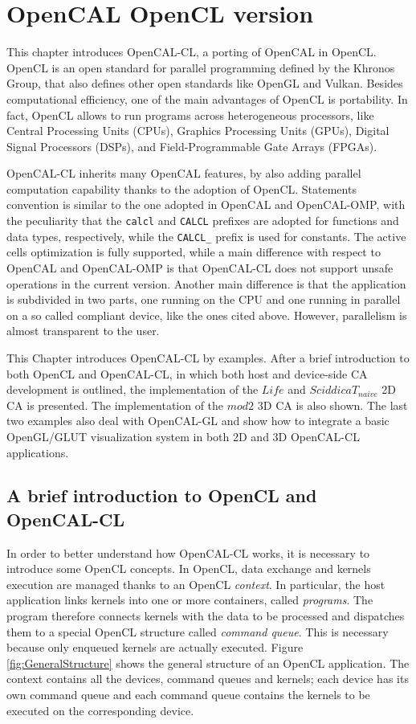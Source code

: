 \chapter{OpenCAL OpenCL version}\label{ch:opencal-cl}

This chapter introduces OpenCAL-CL, a porting of OpenCAL in
OpenCL. OpenCL is an open standard for parallel programming defined by the
Khronos Group, that also defines other open standards like OpenGL and
Vulkan. Besides computational efficiency, one of the main advantages
of OpenCL is portability. In fact, OpenCL allows to run programs across
heterogeneous processors, like Central Processing Units (CPUs),
Graphics Processing Units (GPUs), Digital Signal Processors (DSPs),
and Field-Programmable Gate Arrays (FPGAs).

OpenCAL-CL inherits many OpenCAL features, by also adding parallel
computation capability thanks to the adoption of OpenCL. Statements
convention is similar to the one adopted in OpenCAL and OpenCAL-OMP,
with the peculiarity that the \verb'calcl' and \verb'CALCL' prefixes
are adopted for functions and data types, respectively, while the
\verb'CALCL_' prefix is used for constants. The active cells
optimization is fully supported, while a main difference with respect
to OpenCAL and OpenCAL-OMP is that OpenCAL-CL does not support unsafe
operations in the current version. Another main difference is that the
application is subdivided in two parts, one running on the CPU and one
running in parallel on a so called compliant device, like the ones
cited above. However, parallelism is almost transparent to the
user.

This Chapter introduces OpenCAL-CL by examples. After a brief
introduction to both OpenCL and OpenCAL-CL, in which both host and
device-side CA development is outlined, the implementation of the
$Life$ and $SciddicaT_{naive}$ 2D CA is presented. The implementation
of the $mod2$ 3D CA is also shown. The last two examples also deal
with OpenCAL-GL and show how to integrate a basic OpenGL/GLUT
visualization system in both 2D and 3D OpenCAL-CL applications.


\section{A brief introduction to OpenCL and OpenCAL-CL}\label{sec:opencalclstructure}

In order to better understand how OpenCAL-CL works, it is necessary to
introduce some OpenCL concepts. In OpenCL, data exchange and kernels
execution are managed thanks to an OpenCL \emph{context}. In
particular, the host application links kernels into one or more
containers, called \emph{programs}. The program therefore connects
kernels with the data to be processed and dispatches them to a special
OpenCL structure called \emph{command queue}. This is necessary
because only enqueued kernels are actually executed. Figure
\ref{fig:GeneralStructure} shows the general structure of an OpenCL
application. The context contains all the devices, command queues and
kernels; each device has its own command queue and each command queue
contains the kernels to be executed on the corresponding device.

